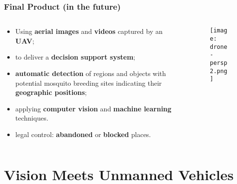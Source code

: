\documentclass{beamer}
\begin{document}
		\begin{frame}
			\frametitle{Final Product (in the future)}

			\begin{columns}
				\begin{column}{0.55\linewidth}
					\begin{itemize}
						\item Using {\bf aerial images} and {\bf videos} captured by an {\bf UAV};
						\item to deliver a \textbf{decision support system}; %
						\item {\bf automatic detection} of regions and objects with {potential mosquito breeding sites}
						indicating their \textbf{geographic positions}; %
						\item applying {\bf computer vision} and {\bf machine learning} techniques.
						\item legal control: \textbf{abandoned} or \textbf{blocked} places.
					\end{itemize}
				\end{column}
				\begin{column}{0.45\linewidth}
					\begin{figure}[htb]
						\centering
						\texttt{[image: drone-persp2.png]}
						\label{fig:zframer1}
					\end{figure}

				\end{column}
			\end{columns}
		\end{frame}

\section{Vision Meets Unmanned Vehicles}

\end{document}
